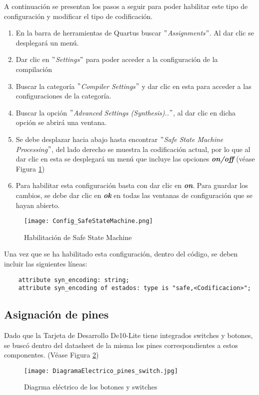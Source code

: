 \documentclass{article}
\begin{document}
A continuación se presentan los pasos a seguir para poder habilitar este tipo de configuración y modificar el tipo de codificación.
\begin{enumerate}
    \item En la barra de herramientas de Quartus buscar \textit{$"$Assignments$"$}. Al dar clic se desplegará un menú.
    \item Dar clic en \textit{$"$Settings$"$} para poder acceder a la configuración de la compilación
    \item Buscar la categoría \textit{$"$Compiler Settings$"$} y dar clic en esta para acceder a las configuraciones de la categoría.
    \item Buscar la opción \textit{$"$Advanced Settings (Synthesis)..$"$}, al dar clic en dicha opción se abrirá una ventana.
    \item Se debe desplazar hacia abajo hasta encontrar \textit{$"$Safe State Machine Processing$"$}, del lado derecho se muestra la codificación actual, por lo que al dar clic en esta se desplegará un menú que incluye las opciones \textbf{\textit{on/off}} (véase Figura \ref{fig:Config_SafeStateMachine})
    \item Para habilitar esta configuración basta con dar clic en \textbf{\textit{on}}. Para guardar los cambios, se debe dar clic en \textbf{\textit{ok}} en todas las ventanas de configuración que se hayan abierto.
\end{enumerate}
\begin{figure}[h!]
        \centering
        \texttt{[image: Config\_SafeStateMachine.png]}
        \caption{\label{fig:Config_SafeStateMachine}Habilitación de Safe State Machine}
    \end{figure}
Una vez que se ha habilitado esta configuración, dentro del código, se deben incluir las siguientes líneas:

\begin{lstlisting}
    attribute syn_encoding: string;
    attribute syn_encoding of estados: type is "safe,<Codificacion>";
\end{lstlisting}
\subsection{Asignación de pines}
Dado que la Tarjeta de Desarrollo De10-Lite tiene integrados switches y botones, se buscó dentro del datasheet de la misma los pines correspondientes a estos componentes. (Véase Figura \ref{fig:DiagramaElectrico1})
\begin{figure}[h!]
        \centering
        \texttt{[image: DiagramaElectrico\_pines\_switch.jpg]}
        \caption{\label{fig:DiagramaElectrico1}Diagrma eléctrico de los botones y switches}
    \end{figure}
    
\end{document}
